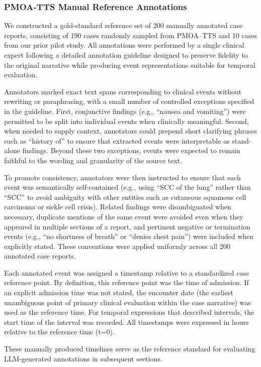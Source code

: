 
\subsubsection{PMOA-TTS Manual Reference Annotations}\label{ch05:sec:gold-standard-annotations}

We constructed a gold-standard reference set of 200 manually annotated case reports, consisting of 190 cases randomly sampled from PMOA–TTS and 10 cases from our prior pilot study.
All annotations were performed by a single clinical expert following a detailed annotation guideline designed to preserve fidelity to the original narrative while producing event representations suitable for temporal evaluation.

Annotators marked exact text spans corresponding to clinical events without rewriting or paraphrasing, with a small number of controlled exceptions specified in the guideline.
First, conjunctive findings (e.g., “nausea and vomiting”) were permitted to be split into individual events when clinically meaningful.
Second, when needed to supply context, annotators could prepend short clarifying phrases such as “history of” to ensure that extracted events were interpretable as stand-alone findings.
Beyond these two exceptions, events were expected to remain faithful to the wording and granularity of the source text.

To promote consistency, annotators were then instructed to ensure that each event was semantically self-contained (e.g., using “SCC of the lung” rather than “SCC” to avoid ambiguity with other
entities such as cutaneous squamous cell carcinoma or sickle cell crisis).
Related findings were disambiguated when necessary, duplicate mentions of the same event were avoided even when they appeared in multiple sections of a report, and pertinent negative or termination events (e.g., “no shortness of breath” or “denies chest pain”) were included when explicitly stated.
These conventions were applied uniformly across all 200 annotated case reports.

Each annotated event was assigned a timestamp relative to a standardized case reference point.
By definition, this reference point was the time of admission.
If an explicit admission time was not stated, the encounter date (the earliest unambiguous point of primary clinical evaluation within the case narrative) was used as the reference time.
For temporal expressions that described intervals, the start time of the interval was recorded.
All timestamps were expressed in hours relative to the reference time (t=0).

These manually produced timelines serve as the reference standard for evaluating LLM-generated annotations in subsequent sections.
